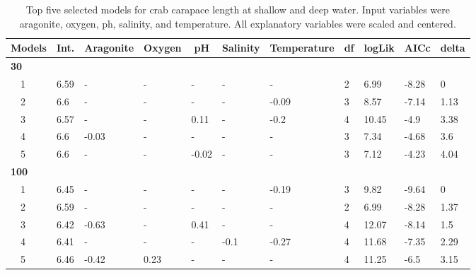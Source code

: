 \documentclass[letterpaper,12pt]{article}\usepackage[]{graphicx}\usepackage[]{color}
\begin{document}
\begin{landscape}
\centering\vspace*{\fill}
\begin{table}[!tbp]
{\scriptsize
\caption{Top five selected models for crab carapace length at shallow and deep water. Input variables were aragonite, oxygen, ph, salinity, and temperature.  All explanatory variables were scaled and centered.\label{tab:cltab}} 
\begin{center}
\begin{tabular}{lllllllllll}
\hline\hline
\multicolumn{1}{l}{Models}&\multicolumn{1}{c}{Int.}&\multicolumn{1}{c}{Aragonite}&\multicolumn{1}{c}{Oxygen}&\multicolumn{1}{c}{pH}&\multicolumn{1}{c}{Salinity}&\multicolumn{1}{c}{Temperature}&\multicolumn{1}{c}{df}&\multicolumn{1}{c}{logLik}&\multicolumn{1}{c}{AICc}&\multicolumn{1}{c}{delta}\tabularnewline
\hline
{\bfseries 30}&&&&&&&&&&\tabularnewline
~~1&6.59&-&-&-&-&-&2&6.99&-8.28&0\tabularnewline
~~2&6.6&-&-&-&-&-0.09&3&8.57&-7.14&1.13\tabularnewline
~~3&6.57&-&-&0.11&-&-0.2&4&10.45&-4.9&3.38\tabularnewline
~~4&6.6&-0.03&-&-&-&-&3&7.34&-4.68&3.6\tabularnewline
~~5&6.6&-&-&-0.02&-&-&3&7.12&-4.23&4.04\tabularnewline
\hline
{\bfseries 100}&&&&&&&&&&\tabularnewline
~~1&6.45&-&-&-&-&-0.19&3&9.82&-9.64&0\tabularnewline
~~2&6.59&-&-&-&-&-&2&6.99&-8.28&1.37\tabularnewline
~~3&6.42&-0.63&-&0.41&-&-&4&12.07&-8.14&1.5\tabularnewline
~~4&6.41&-&-&-&-0.1&-0.27&4&11.68&-7.35&2.29\tabularnewline
~~5&6.46&-0.42&0.23&-&-&-&4&11.25&-6.5&3.15\tabularnewline
\hline
\end{tabular}\end{center}}
\end{table}

\end{landscape}
\end{document}
